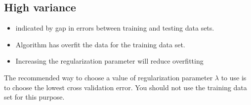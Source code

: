


\subsection*{High variance}

\begin{itemize}
\item indicated by gap in errors between training and testing data sets.
\item Algorithm has overfit the data for the training data set.
\item Increasing the regularization parameter will reduce overfitting
\end{itemize}
The recommended way to choose a value of regularization parameter $\lambda$ to use is to choose
the lowest cross validation error.
You should not use the training data set for this purpose.
